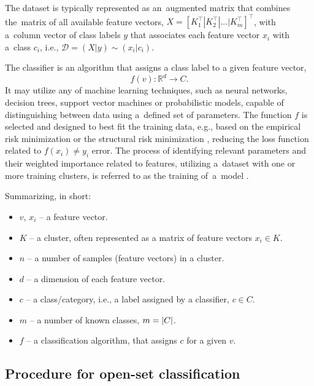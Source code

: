 The dataset is typically represented as an~augmented matrix that combines the~matrix of all available feature vectors, $X = \left[ K_1^\top | K_2^\top | ... | K_m^\top \right]^\top$, with a~column vector of class labels $y$ that associates each feature vector $x_i$ with a~class $c_i$, i.e., $\mathcal{D} = (X | y) \sim (x_i | c_i)$.

The classifier is an algorithm that assigns a class label to a given feature vector,
\begin{equation}
    f(v) : \mathbb{R}^d \rightarrow C
    .
\end{equation}
It may utilize any of machine learning techniques, such as neural networks, decision trees, support vector machines or probabilistic models, capable of distinguishing between data using a~defined set of parameters. The function $f$ is selected and designed to best fit the training data, e.g., based on the empirical risk minimization or the structural risk minimization \cite{Vapnik-1999}, reducing the loss function related to $f(x_i) \neq y_i$ error. The process of identifying relevant parameters and their weighted importance related to features, utilizing a~dataset with one or more training clusters, is referred to as the training of~a~model \cite{Hastie-2009}.

\clearpage{}

Summarizing, in short:
\vspace{-0.5\baselineskip}
\begin{itemize}
    \item $v$, $x_i$ – a feature vector.
    \item $K$ – a cluster, often represented as a matrix of feature vectors $x_i \in K$.
    \item $n$ – a number of samples (feature vectors) in a cluster.
    \item $d$ – a dimension of each feature vector.
    \item $c$ – a class/category, i.e., a label assigned by a classifier, $c \in C$.
    \item $m$ – a number of known classes, $m = \abs{C}$.
    \item $f$ – a classification algorithm, that assigns $c$ for a given $v$.
\end{itemize}


\subsection{Procedure for open-set classification}
\label{section:procedure}

